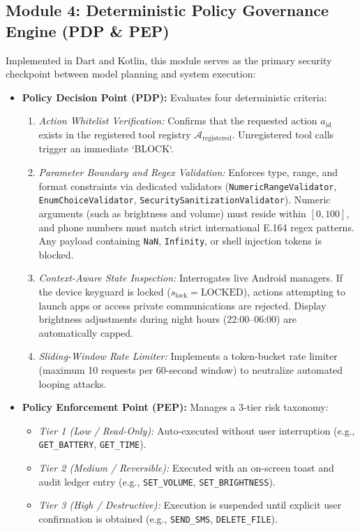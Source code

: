 \subsection{Module 4: Deterministic Policy Governance Engine (PDP \& PEP)}
Implemented in Dart and Kotlin, this module serves as the primary security checkpoint between model planning and system execution:
\begin{itemize}
    \item \textbf{Policy Decision Point (PDP):} Evaluates four deterministic criteria:
    \begin{enumerate}
        \item \textit{Action Whitelist Verification:} Confirms that the requested action $a_{\text{id}}$ exists in the registered tool registry $\mathcal{A}_{\text{registered}}$. Unregistered tool calls trigger an immediate `BLOCK`.
        \item \textit{Parameter Boundary and Regex Validation:} Enforces type, range, and format constraints via dedicated validators (\texttt{NumericRangeValidator}, \texttt{EnumChoiceValidator}, \texttt{SecuritySanitizationValidator}). Numeric arguments (such as brightness and volume) must reside within $[0, 100]$, and phone numbers must match strict international E.164 regex patterns. Any payload containing \texttt{NaN}, \texttt{Infinity}, or shell injection tokens is blocked.
        \item \textit{Context-Aware State Inspection:} Interrogates live Android managers. If the device keyguard is locked ($s_{\text{lock}} = \text{LOCKED}$), actions attempting to launch apps or access private communications are rejected. Display brightness adjustments during night hours (22:00--06:00) are automatically capped.
        \item \textit{Sliding-Window Rate Limiter:} Implements a token-bucket rate limiter (maximum 10 requests per 60-second window) to neutralize automated looping attacks.
    \end{enumerate}
    \item \textbf{Policy Enforcement Point (PEP):} Manages a 3-tier risk taxonomy:
    \begin{itemize}
        \item \textit{Tier 1 (Low / Read-Only):} Auto-executed without user interruption (e.g., \texttt{GET\_BATTERY}, \texttt{GET\_TIME}).
        \item \textit{Tier 2 (Medium / Reversible):} Executed with an on-screen toast and audit ledger entry (e.g., \texttt{SET\_VOLUME}, \texttt{SET\_BRIGHTNESS}).
        \item \textit{Tier 3 (High / Destructive):} Execution is suspended until explicit user confirmation is obtained (e.g., \texttt{SEND\_SMS}, \texttt{DELETE\_FILE}).
    \end{itemize}
\end{itemize}

